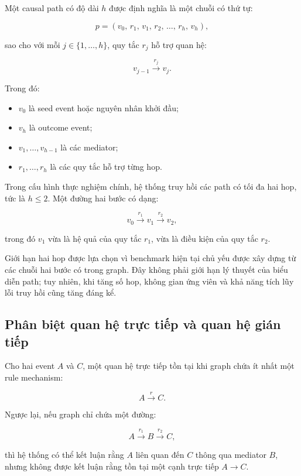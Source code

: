 Một causal path có độ dài \(h\) được định nghĩa là một chuỗi có thứ tự:

\begin{equation}
p =
\left(
    v_0,\,
    r_1,\,
    v_1,\,
    r_2,\,
    \ldots,\,
    r_h,\,
    v_h
\right),
\label{eq:path}
\end{equation}

sao cho với mỗi \(j \in \{1,\ldots,h\}\), quy tắc \(r_j\) hỗ trợ quan hệ:

\[
v_{j-1}
\xrightarrow{r_j}
v_j.
\]

Trong đó:

\begin{itemize}
    \item \(v_0\) là seed event hoặc nguyên nhân khởi đầu;
    \item \(v_h\) là outcome event;
    \item \(v_1,\ldots,v_{h-1}\) là các mediator;
    \item \(r_1,\ldots,r_h\) là các quy tắc hỗ trợ từng hop.
\end{itemize}

Trong cấu hình thực nghiệm chính, hệ thống truy hồi các path có tối đa hai
hop, tức là \(h \leq 2\). Một đường hai bước có dạng:

\[
v_0
\xrightarrow{r_1}
v_1
\xrightarrow{r_2}
v_2,
\]

trong đó \(v_1\) vừa là hệ quả của quy tắc \(r_1\), vừa là điều kiện của
quy tắc \(r_2\).

Giới hạn hai hop được lựa chọn vì benchmark hiện tại chủ yếu được xây dựng
từ các chuỗi hai bước có trong graph. Đây không phải giới hạn lý thuyết của
biểu diễn path; tuy nhiên, khi tăng số hop, không gian ứng viên và khả năng
tích lũy lỗi truy hồi cũng tăng đáng kể.

\subsection{Phân biệt quan hệ trực tiếp và quan hệ gián tiếp}

Cho hai event \(A\) và \(C\), một quan hệ trực tiếp tồn tại khi graph chứa
ít nhất một rule mechanism:

\[
A \xrightarrow{r} C.
\]

Ngược lại, nếu graph chỉ chứa một đường:

\[
A \xrightarrow{r_1} B \xrightarrow{r_2} C,
\]

thì hệ thống có thể kết luận rằng \(A\) liên quan đến \(C\) thông qua
mediator \(B\), nhưng không được kết luận rằng tồn tại một cạnh trực tiếp
\(A \rightarrow C\).

